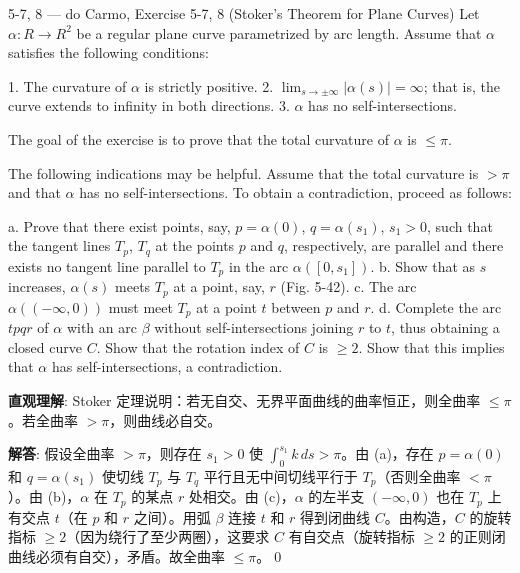 \begin{exercise}{5-7, 8 — do Carmo, Exercise 5-7, 8 (Stoker's Theorem for Plane Curves)}
Let $\alpha \colon R \to R^2$ be a regular plane curve parametrized by arc length. Assume that $\alpha$ satisfies the following conditions:

1. The curvature of $\alpha$ is strictly positive.
2. $\lim_{s\to \pm \infty}|\alpha (s)| = \infty$; that is, the curve extends to infinity in both directions.
3. $\alpha$ has no self-intersections.

The goal of the exercise is to prove that the total curvature of $\alpha$ is $\leq \pi$.

The following indications may be helpful. Assume that the total curvature is $> \pi$ and that $\alpha$ has no self-intersections. To obtain a contradiction, proceed as follows:

a. Prove that there exist points, say, $p = \alpha(0)$, $q = \alpha(s_1)$, $s_1 > 0$, such that the tangent lines $T_p$, $T_q$ at the points $p$ and $q$, respectively, are parallel and there exists no tangent line parallel to $T_p$ in the arc $\alpha([0, s_1])$.
b. Show that as $s$ increases, $\alpha(s)$ meets $T_p$ at a point, say, $r$ (Fig. 5-42).
c. The arc $\alpha ((-\infty ,0))$ must meet $T_{p}$ at a point $t$ between $p$ and $r$.
d. Complete the arc $tpqr$ of $\alpha$ with an arc $\beta$ without self-intersections joining $r$ to $t$, thus obtaining a closed curve $C$. Show that the rotation index of $C$ is $\geq 2$. Show that this implies that $\alpha$ has self-intersections, a contradiction.
\end{exercise}
\begin{solution}
\textbf{直观理解}: Stoker 定理说明：若无自交、无界平面曲线的曲率恒正，则全曲率 $\leq\pi$。若全曲率 $> \pi$，则曲线必自交。

\textbf{解答}: 假设全曲率 $> \pi$，则存在 $s_1>0$ 使 $\int_0^{s_1}k\,ds>\pi$。由 (a)，存在 $p=\alpha(0)$ 和 $q=\alpha(s_1)$ 使切线 $T_p$ 与 $T_q$ 平行且无中间切线平行于 $T_p$（否则全曲率 $<\pi$）。由 (b)，$\alpha$ 在 $T_p$ 的某点 $r$ 处相交。由 (c)，$\alpha$ 的左半支 $(-\infty,0)$ 也在 $T_p$ 上有交点 $t$（在 $p$ 和 $r$ 之间）。用弧 $\beta$ 连接 $t$ 和 $r$ 得到闭曲线 $C$。由构造，$C$ 的旋转指标 $\geq 2$（因为绕行了至少两圈），这要求 $C$ 有自交点（旋转指标 $\geq 2$ 的正则闭曲线必须有自交），矛盾。故全曲率 $\leq\pi$。\qed
\end{solution}

